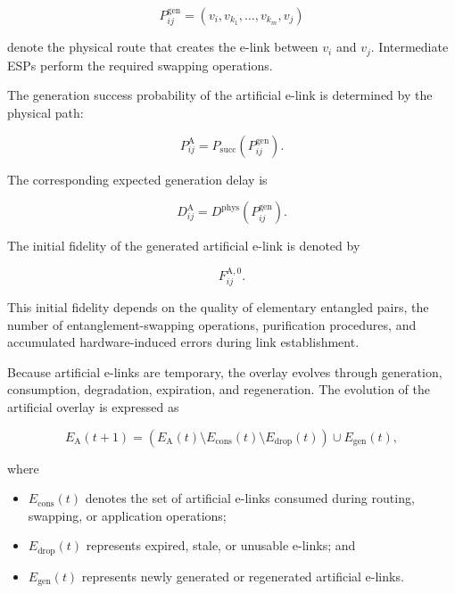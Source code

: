 \begin{equation}
    P_{ij}^{\mathrm{gen}}
    =
    \left(
    v_i,
    v_{k_1},
    \ldots,
    v_{k_m},
    v_j
    \right)
\end{equation}

denote the physical route that creates the e-link between $v_i$ and $v_j$.
Intermediate ESPs perform the required swapping operations.

The generation success probability of the artificial e-link is determined by the physical path:

\begin{equation}
    P_{ij}^{\mathrm{A}}
    =
    P_{\mathrm{succ}}
    \left(
    P_{ij}^{\mathrm{gen}}
    \right).
\end{equation}

The corresponding expected generation delay is

\begin{equation}
    D_{ij}^{\mathrm{A}}
    =
    D^{\mathrm{phys}}
    \left(
    P_{ij}^{\mathrm{gen}}
    \right).
\end{equation}

The initial fidelity of the generated artificial e-link is denoted by

\begin{equation}
    F_{ij}^{\mathrm{A},0}.
\end{equation}

This initial fidelity depends on the quality of elementary entangled pairs, the number of entanglement-swapping operations, purification procedures, and accumulated hardware-induced errors during link establishment.

Because artificial e-links are temporary, the overlay evolves through
generation, consumption, degradation, expiration, and regeneration. The evolution of the artificial overlay is expressed as

\begin{equation}
    E_{\mathrm{A}}(t+1)
    =
    \left(
    E_{\mathrm{A}}(t)
    \setminus
    E_{\mathrm{cons}}(t)
    \setminus
    E_{\mathrm{drop}}(t)
    \right)
    \cup
    E_{\mathrm{gen}}(t),
\end{equation}

where

\begin{itemize}
    \item $E_{\mathrm{cons}}(t)$ denotes the set of artificial e-links consumed during routing, swapping, or application operations;
    \item $E_{\mathrm{drop}}(t)$ represents expired, stale, or unusable e-links; and
    \item $E_{\mathrm{gen}}(t)$ represents newly generated or regenerated artificial e-links.
\end{itemize}

